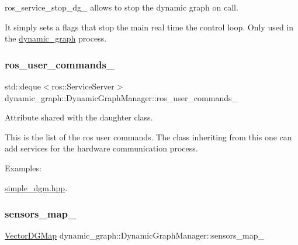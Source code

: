 ros\+\_\+service\+\_\+stop\+\_\+dg\+\_\+ allows to stop the dynamic graph on call. 

It simply sets a flags that stop the main real time the control loop. Only used in the \hyperlink{namespacedynamic__graph}{dynamic\+\_\+graph} process. \mbox{\label{classdynamic__graph_1_1DynamicGraphManager_a0fb35bc44f331db3570c09b75b49cd15}} 
\subsubsection{\texorpdfstring{ros\+\_\+user\+\_\+commands\+\_\+}{ros\_user\_commands\_}}
{\footnotesize\ttfamily std\+::deque$<$ros\+::\+Service\+Server$>$ dynamic\+\_\+graph\+::\+Dynamic\+Graph\+Manager\+::ros\+\_\+user\+\_\+commands\+\_\+\hspace{0.3cm}{\ttfamily [protected]}}



Attribute shared with the daughter class. 

This is the list of the ros user commands. The class inheriting from this one can add services for the hardware communication process. \begin{Desc}
\item[Examples\+: ]\par
\hyperlink{simple_dgm_8hpp-example}{simple\+\_\+dgm.\+hpp}.\end{Desc}
\mbox{\label{classdynamic__graph_1_1DynamicGraphManager_a896bf6cb22d2d88a5a6a307a2e44608e}} 
\subsubsection{\texorpdfstring{sensors\+\_\+map\+\_\+}{sensors\_map\_}}
{\footnotesize\ttfamily \hyperlink{namespacedynamic__graph_abd184187f3bc15df5e227d866529e4a7}{Vector\+D\+G\+Map} dynamic\+\_\+graph\+::\+Dynamic\+Graph\+Manager\+::sensors\+\_\+map\+\_\+\hspace{0.3cm}{\ttfamily [protected]}}



